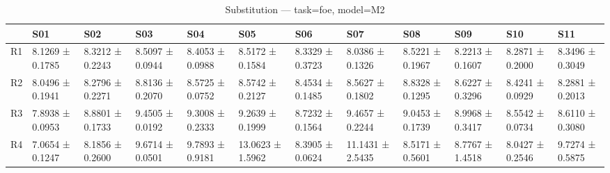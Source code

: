 \begin{table}[htbp]
\centering
\caption{Substitution — task=foe, model=M2}
\label{tab:sub:foe:M2}
\begin{tabular}{llllllllllll}
\toprule
\toprule
 & S01 & S02 & S03 & S04 & S05 & S06 & S07 & S08 & S09 & S10 & S11 \\
\midrule
\midrule
R1 & 8.1269 ± 0.1785 & 8.3212 ± 0.2243 & 8.5097 ± 0.0944 & 8.4053 ± 0.0988 & 8.5172 ± 0.1584 & 8.3329 ± 0.3723 & 8.0386 ± 0.1326 & 8.5221 ± 0.1967 & 8.2213 ± 0.1607 & 8.2871 ± 0.2000 & 8.3496 ± 0.3049 \\
R2 & 8.0496 ± 0.1941 & 8.2796 ± 0.2271 & 8.8136 ± 0.2070 & 8.5725 ± 0.0752 & 8.5742 ± 0.2127 & 8.4534 ± 0.1485 & 8.5627 ± 0.1802 & 8.8328 ± 0.1295 & 8.6227 ± 0.3296 & 8.4241 ± 0.0929 & 8.2881 ± 0.2013 \\
R3 & 7.8938 ± 0.0953 & 8.8801 ± 0.1733 & 9.4505 ± 0.0192 & 9.3008 ± 0.2333 & 9.2639 ± 0.1999 & 8.7232 ± 0.1564 & 9.4657 ± 0.2244 & 9.0453 ± 0.1739 & 8.9968 ± 0.3417 & 8.5542 ± 0.0734 & 8.6110 ± 0.3080 \\
R4 & 7.0654 ± 0.1247 & 8.1856 ± 0.2600 & 9.6714 ± 0.0501 & 9.7893 ± 0.9181 & 13.0623 ± 1.5962 & 8.3905 ± 0.0624 & 11.1431 ± 2.5435 & 8.5171 ± 0.5601 & 8.7767 ± 1.4518 & 8.0427 ± 0.2546 & 9.7274 ± 0.5875 \\
\bottomrule
\end{tabular}\end{table}

